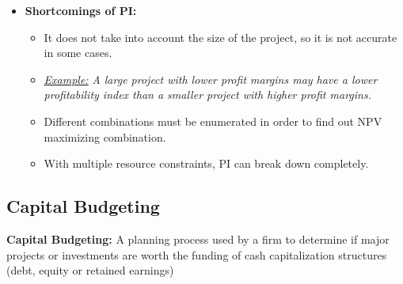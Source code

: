 \documentclass[ieeetran]{article}
\begin{document}
\begin{itemize}
\begin{itemize}
\end{itemize}
\item \textbf{Shortcomings of PI:}
	\begin{itemize}
	  \item It does not take into account the size of the project, so it is not accurate in some cases.
	\item \underline{\textit{Example:}} \textit{A large project with lower profit margins may have a lower profitability index than a smaller project with higher profit margins.}
	\item Different combinations must be enumerated in order to find out NPV maximizing combination.
	\item With multiple resource constraints, PI can break down completely.
	\end{itemize}

\end{itemize}

\subsection{Capital Budgeting} %
\label{sub:capital_budgeting}
\textbf{Capital Budgeting:} A planning process used by a firm to determine if major projects or investments are worth the funding of cash capitalization structures (debt, equity or retained earnings)







\end{document}
